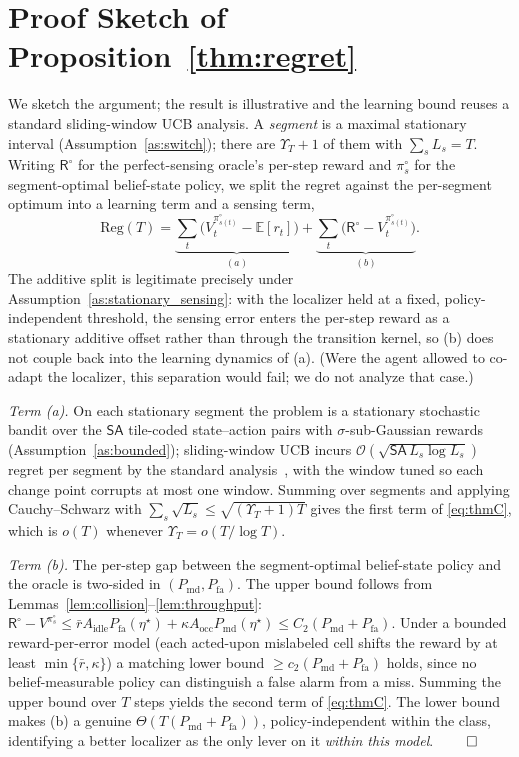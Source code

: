 \documentclass[journal]{IEEEtran}
\newcommand{\E}{\mathbb{E}}
\newcommand{\Pmd}{P_{\mathrm{md}}}         %
\newcommand{\Pfa}{P_{\mathrm{fa}}}         %
\newcommand{\thr}{\eta}                    %
\newcommand{\pol}{\pi}                     %
\newcommand{\bigT}{T}                      %
\newcommand{\thru}{\mathsf{R}}             %
\newcommand{\regret}{\mathrm{Reg}}         %
\begin{document}
\section{Proof Sketch of Proposition~\ref{thm:regret}}
\label{sec:appendix_regret}

We sketch the argument; the result is illustrative and the learning bound
reuses a standard sliding-window UCB analysis. A \emph{segment} is a maximal
stationary interval (Assumption~\ref{as:switch}); there are
$\Upsilon_{\bigT}+1$ of them with $\sum_s L_s=\bigT$. Writing $\thru^{\circ}$
for the perfect-sensing oracle's per-step reward and $\pol^{\circ}_s$ for the
segment-optimal belief-state policy, we split the regret against the
per-segment optimum into a learning term and a sensing term,
\begin{equation}
\regret(\bigT)=
\underbrace{\textstyle\sum_{t}\big(V^{\pol^{\circ}_{s(t)}}_t-\E[r_t]\big)}_{(a)}
+\underbrace{\textstyle\sum_{t}\big(\thru^{\circ}-V^{\pol^{\circ}_{s(t)}}_t\big)}_{(b)}.
\label{eq:appC_decomp}
\end{equation}
The additive split is legitimate precisely under
Assumption~\ref{as:stationary_sensing}: with the localizer held at a fixed,
policy-independent threshold, the sensing error enters the per-step reward as
a stationary additive offset rather than through the transition kernel, so (b)
does not couple back into the learning dynamics of (a). (Were the agent
allowed to co-adapt the localizer, this separation would fail; we do not
analyze that case.)

\emph{Term (a).} On each stationary segment the problem is a stationary
stochastic bandit over the $\mathsf{SA}$ tile-coded state--action pairs with
$\sigma$-sub-Gaussian rewards (Assumption~\ref{as:bounded}); sliding-window
UCB incurs $\mathcal{O}(\sqrt{\mathsf{SA}\,L_s\log L_s})$ regret per segment by
the standard analysis~\cite{garivier2011ucb}, with the window tuned so each
change point corrupts at most one window. Summing over segments and applying
Cauchy--Schwarz with $\sum_s\sqrt{L_s}\le\sqrt{(\Upsilon_{\bigT}{+}1)\bigT}$
gives the first term of \eqref{eq:thmC}, which is $o(\bigT)$ whenever
$\Upsilon_{\bigT}=o(\bigT/\log\bigT)$.

\emph{Term (b).} The per-step gap between the segment-optimal belief-state
policy and the oracle is two-sided in $(\Pmd,\Pfa)$. The upper bound follows
from Lemmas~\ref{lem:collision}--\ref{lem:throughput}:
$\thru^{\circ}-V^{\pol^{\circ}_s}\le \bar r A_{\mathrm{idle}}\Pfa(\thr^\star)
+\kappa A_{\mathrm{occ}}\Pmd(\thr^\star)\le C_2(\Pmd+\Pfa)$. Under a
bounded reward-per-error model (each acted-upon mislabeled cell shifts the
reward by at least $\min\{\bar r,\kappa\}$) a matching lower bound
$\ge c_2(\Pmd+\Pfa)$ holds, since no belief-measurable policy can distinguish
a false alarm from a miss. Summing the upper bound over $\bigT$ steps yields
the second term of \eqref{eq:thmC}. The lower bound makes (b) a genuine
$\Theta(\bigT(\Pmd+\Pfa))$, policy-independent within the class, identifying a
better localizer as the only lever on it \emph{within this model}.
\hfill$\qed$
{\small


}
\end{document}
